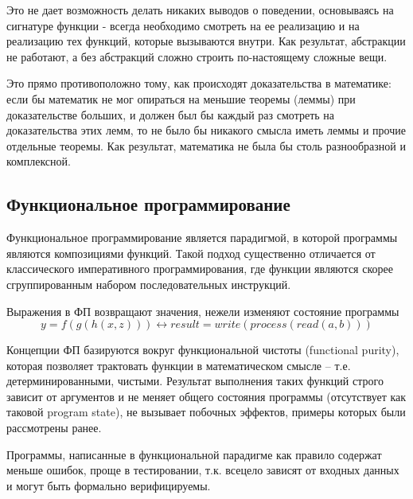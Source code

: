 \documentclass[a4paper,14pt]{extreport} %
\begin{document}
Это не дает возможность делать никаких выводов о поведении, основываясь на сигнатуре функции - всегда необходимо смотреть на ее реализацию и на реализацию тех функций, которые вызываются внутри. Как результат, абстракции не работают, а без абстракций сложно строить по-настоящему сложные вещи.

Это прямо противоположно тому, как происходят доказательства в математике: если бы математик не мог опираться на меньшие теоремы (леммы) при доказательстве больших, и должен был бы каждый раз смотреть на доказательства этих лемм, то не было бы никакого смысла иметь леммы и прочие отдельные теоремы. Как результат, математика не была бы столь разнообразной и комплексной.



\subsection{Функциональное программирование}

 Функциональное программирование является парадигмой, в которой программы являются композициями функций. Такой подход существенно отличается от классического императивного программирования, где функции являются скорее сгруппированным набором последовательных  инструкций.

 Выражения в ФП возвращают значения, нежели изменяют состояние программы
 $$y = f(g(h(x, z))) \leftrightarrow result = write(process(read(a, b)))$$

 Концепции ФП базируются вокруг функциональной чистоты (functional purity), которая позволяет трактовать функции в математическом смысле -- т.е. детерминированными, чистыми. Результат выполнения таких функций строго зависит от аргументов и не меняет общего состояния программы (отсутствует как таковой program state), не вызывает побочных эффектов, примеры которых были рассмотрены ранее.

 Программы, написанные в функциональной парадигме как правило содержат меньше ошибок, проще в тестировании, т.к. всецело зависят от входных данных и могут быть формально верифицируемы.
\end{document}
